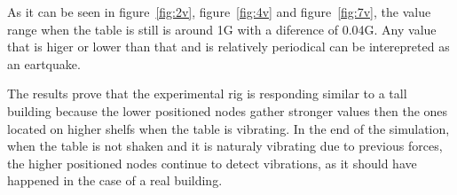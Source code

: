 As it can be seen in figure~\ref{fig:2v}, figure~\ref{fig:4v} and figure~\ref{fig:7v}, the value range when the table is still is around 1G with a diference of 0.04G. Any value that is higer or lower than that and is relatively periodical can be interepreted as an eartquake. 

The results prove that the experimental rig is responding similar to a tall building because the lower positioned nodes gather stronger values then the ones located on higher shelfs when the table is vibrating. In the end of the simulation, when the table is not shaken and it is naturaly vibrating due to previous forces, the higher positioned nodes continue to detect vibrations, as it should have happened in the case of a real building.
